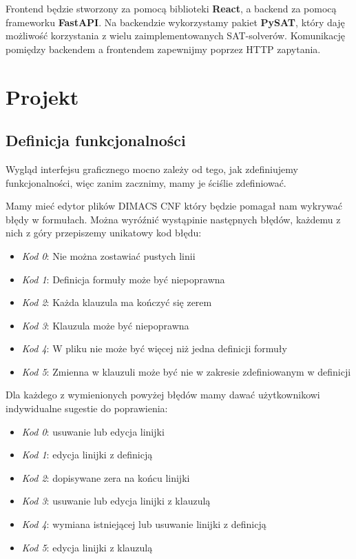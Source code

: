 \documentclass[a4paper,12pt,oneside]{book}
\theoremstyle{definition}
\begin{document}
Frontend będzie stworzony za pomocą biblioteki \textbf{React}, a backend za pomocą frameworku \textbf{FastAPI}. Na backendzie wykorzystamy pakiet \textbf{PySAT}, który daję możliwość korzystania z wielu zaimplementowanych SAT-solverów. Komunikację pomiędzy backendem a frontendem zapewnijmy poprzez HTTP zapytania.

\chapter{Projekt}

\section{Definicja funkcjonalności}

Wygląd interfejsu graficznego mocno zależy od tego, jak zdefiniujemy funkcjonalności, więc zanim zacznimy, mamy je ściślie zdefiniować.  

Mamy mieć edytor plików DIMACS CNF który będzie pomagał nam wykrywać błędy w formułach. Można wyróźnić wystąpinie następnych błędów, każdemu z nich z góry przepiszemy unikatowy kod błędu:

\begin{itemize}
    \item \textit{Kod 0}: Nie można zostawiać pustych linii
    \item \textit{Kod 1}: Definicja formuły może być niepoprawna
    \item \textit{Kod 2}: Każda klauzula ma kończyć się zerem
    \item \textit{Kod 3}: Klauzula może być niepoprawna
    \item \textit{Kod 4}: W pliku nie może być więcej niż jedna definicji formuły
    \item \textit{Kod 5}: Zmienna w klauzuli może być nie w zakresie zdefiniowanym w definicji
\end{itemize}

\noindent Dla każdego z wymienionych powyżej błędów mamy dawać użytkownikowi indywidualne sugestie do poprawienia:

\begin{itemize}
    \item \textit{Kod 0}: usuwanie lub edycja linijki
    \item \textit{Kod 1}: edycja linijki z definicją
    \item \textit{Kod 2}: dopisywane zera na końcu linijki
    \item \textit{Kod 3}: usuwanie lub edycja linijki z klauzulą
    \item \textit{Kod 4}: wymiana istniejącej lub usuwanie linijki z definicją
    \item \textit{Kod 5}: edycja linijki z klauzulą
\end{itemize}
\end{document}
